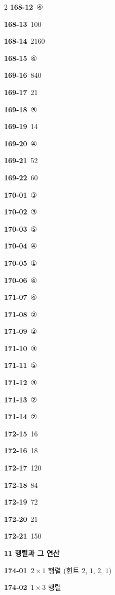 \documentclass[10pt,a4paper]{article}
\begin{document}
\begin{multicols}{2}
\noindent\textbf{168-12}\ ④\par
\noindent\textbf{168-13}\ 100\par
\noindent\textbf{168-14}\ 2160\par
\noindent\textbf{168-15}\ ④\par
\noindent\textbf{169-16}\ 840\par
\noindent\textbf{169-17}\ 21\par
\noindent\textbf{169-18}\ ⑤\par
\noindent\textbf{169-19}\ 14\par
\noindent\textbf{169-20}\ ④\par
\noindent\textbf{169-21}\ 52\par
\noindent\textbf{169-22}\ 60\par
\noindent\textbf{170-01}\ ③\par
\noindent\textbf{170-02}\ ③\par
\noindent\textbf{170-03}\ ⑤\par
\noindent\textbf{170-04}\ ④\par
\noindent\textbf{170-05}\ ①\par
\noindent\textbf{170-06}\ ④\par
\noindent\textbf{171-07}\ ④\par
\noindent\textbf{171-08}\ ②\par
\noindent\textbf{171-09}\ ②\par
\noindent\textbf{171-10}\ ③\par
\noindent\textbf{171-11}\ ⑤\par
\noindent\textbf{171-12}\ ③\par
\noindent\textbf{171-13}\ ②\par
\noindent\textbf{171-14}\ ②\par
\noindent\textbf{172-15}\ 16\par
\noindent\textbf{172-16}\ 18\par
\noindent\textbf{172-17}\ 120\par
\noindent\textbf{172-18}\ 84\par
\noindent\textbf{172-19}\ 72\par
\noindent\textbf{172-20}\ 21\par
\noindent\textbf{172-21}\ 150\par
\noindent\textbf{11 행렬과 그 연산}\par\smallskip
\noindent\textbf{174-01}\ $2\times 1$ 행렬 (힌트 $2$, $1$, $2$, $1$)\par
\noindent\textbf{174-02}\ $1\times 3$ 행렬\par

\end{multicols}
\end{document}
